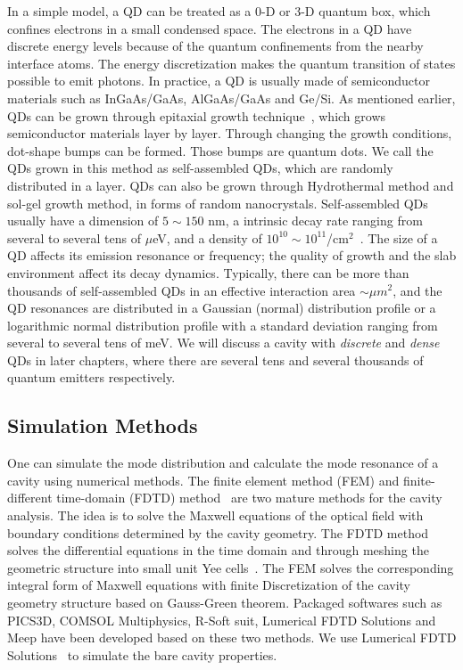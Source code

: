 In a simple model, a QD can be treated as a 0-D or 3-D quantum box, which confines electrons in a small condensed space. The electrons in a QD have discrete energy levels because of the quantum confinements from the nearby interface atoms. The energy discretization makes the quantum transition of states possible to emit photons. In practice, a QD is usually made of semiconductor materials such as InGaAs/GaAs, AlGaAs/GaAs and Ge/Si. As mentioned earlier, QDs can be grown through epitaxial growth technique~\cite{Schliwa2009}, which grows semiconductor materials layer by layer. Through changing the growth conditions, dot-shape bumps can be formed. Those bumps are quantum dots. We call the QDs grown in this method as self-assembled QDs, which are randomly distributed in a layer. QDs can also be grown through Hydrothermal method and sol-gel growth method, in forms of random nanocrystals. Self-assembled QDs usually have a dimension of $5\sim 150$ nm, a intrinsic decay rate ranging from several to several tens of $\mu$eV, and a density of $10^{10}\sim 10^{11}$/cm$^2$~\cite{Amano2006}. The size of a QD affects its emission resonance or frequency; the quality of growth and the slab environment affect its decay dynamics. Typically, there can be more than thousands of self-assembled QDs in an effective interaction area $\sim \mu m^2$, and the QD resonances are distributed in a Gaussian (normal) distribution profile or a logarithmic normal distribution profile with a standard deviation ranging from several to several tens of meV. We will discuss a cavity with {\textit {discrete}} and {\textit {dense}} QDs in later chapters, where there are several tens and several thousands of quantum emitters respectively.

\subsection{Simulation Methods}
One can simulate the mode distribution and calculate the mode resonance of a cavity using numerical methods. The finite element method (FEM) and finite-different time-domain (FDTD) method~\cite{Taflove2005} are two mature methods for the cavity analysis. The idea is to solve the Maxwell equations of the optical field with boundary conditions determined by the cavity geometry. The FDTD method solves the differential equations in the time domain and through meshing the geometric structure into small unit Yee cells~\cite{Taflove2005}. The FEM solves the corresponding integral form of Maxwell equations with finite Discretization of the cavity geometry structure based on Gauss-Green theorem. Packaged softwares such as PICS3D, COMSOL Multiphysics, R-Soft suit, Lumerical FDTD Solutions and Meep have been developed based on these two methods. We use Lumerical FDTD Solutions~\cite{LumericalSolutions} to simulate the bare cavity properties.

